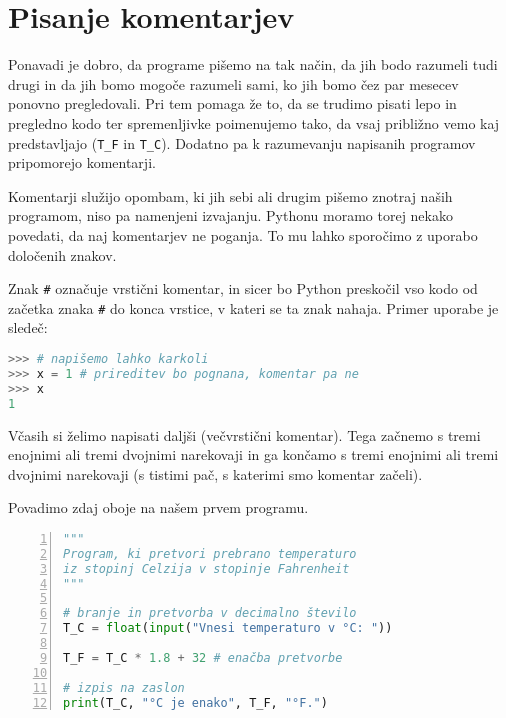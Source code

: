 \section{Pisanje komentarjev}
Ponavadi je dobro, da programe pišemo na tak način, da jih bodo razumeli tudi drugi in da jih bomo mogoče razumeli sami, ko jih bomo čez par mesecev ponovno  pregledovali. Pri tem pomaga že to, da se trudimo pisati lepo in pregledno kodo ter spremenljivke poimenujemo tako, da vsaj približno vemo kaj predstavljajo (\texttt{T\_F} in \texttt{T\_C}). Dodatno pa k razumevanju napisanih programov pripomorejo komentarji.

Komentarji služijo opombam, ki jih sebi ali drugim pišemo znotraj naših programom, niso pa namenjeni izvajanju. Pythonu moramo torej nekako povedati, da naj komentarjev ne poganja. To mu lahko sporočimo z uporabo določenih znakov. 

Znak \texttt{\#} označuje vrstični komentar, in sicer bo Python preskočil vso kodo od začetka znaka \texttt{\#} do konca vrstice, v kateri se ta znak nahaja. Primer uporabe je sledeč:
\begin{lstlisting}[language=Python]
>>> # napišemo lahko karkoli
>>> x = 1 # prireditev bo pognana, komentar pa ne
>>> x
1
\end{lstlisting}

Včasih si želimo napisati daljši (večvrstični komentar). Tega začnemo s tremi enojnimi ali tremi dvojnimi narekovaji in ga končamo s tremi enojnimi ali tremi dvojnimi narekovaji (s tistimi pač, s katerimi smo komentar začeli).

Povadimo zdaj oboje na našem prvem programu.
\begin{lstlisting}[language=Python,numbers=left]
"""
Program, ki pretvori prebrano temperaturo 
iz stopinj Celzija v stopinje Fahrenheit
"""

# branje in pretvorba v decimalno število
T_C = float(input("Vnesi temperaturo v °C: ")) 

T_F = T_C * 1.8 + 32 # enačba pretvorbe

# izpis na zaslon
print(T_C, "°C je enako", T_F, "°F.") 
\end{lstlisting}



